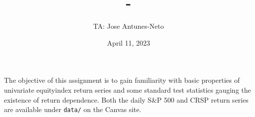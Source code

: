 \documentclass[12pt,twoside]{article}
\title{\course-\assignment}
\author{TA: Jose Antunes-Neto}
\date{April 11, 2023}
\begin{document}
\maketitle

The objective of this assignment is to gain familiarity with basic properties of univariate equityindex return series and some standard test statistics gauging the existence of return dependence. Both the daily S\&P 500 and CRSP return series are available under \texttt{data/} on the Canvas site.

\problem


\clearpage 

\problem


\clearpage

\problem


\clearpage

\problem


\clearpage

\problem


\clearpage

\problem


\clearpage

\problem 


\clearpage

\problem


\clearpage



\end{document}
